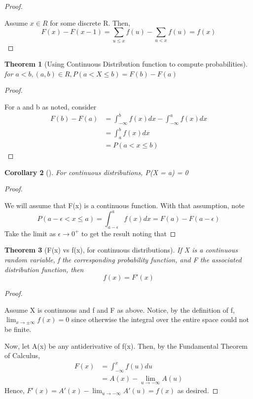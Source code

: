 \documentclass[10pt,]{book}
\theoremstyle{plain}
\newtheorem{theorem}{Theorem}[section]
\newtheorem{corollary}[theorem]{Corollary}
\theoremstyle{definition}
\theoremstyle{definition}
\theoremstyle{definition}
\numberwithin{equation}{section}
\newcommand{\lt}{ < }
\begin{document}
\begin{proof}\hypertarget{proof-25}{}
Assume \(x \in R\) for some discrete R. Then,
		\begin{equation*}F(x) - F(x-1) = \sum_{u \le x} f(u) - \sum_{u \lt x} f(u) = f(x)\end{equation*}
\end{proof}
\begin{theorem}[{Using Continuous Distribution function to compute probabilities}]\label{theorem-Fvsf-continuyous}
for \(a \lt b, (a,b) \in R, P(a \lt X \le b) = F(b) - F(a)\)\end{theorem}
\begin{proof}\hypertarget{proof-26}{}

		For a and b as noted, consider 
		\begin{align*}
F(b) - F(a) & = \int_{-\infty}^b f(x) dx - \int_{-\infty}^a f(x) dx\\
 & = \int_a^b f(x) dx \\
 & = P(a \lt x \le b)
\end{align*}
\end{proof}
\begin{corollary}[{}]\label{corollary-ProbPointZero-continuous}
For continuous distributions, P(X = a) = 0\end{corollary}
\begin{proof}\hypertarget{proof-27}{}

		We will assume that F(x) is a continuous function. With that assumption, note
		\begin{equation*}P(a-\epsilon \lt  x \le a)  = \int_{a-\epsilon}^a f(x) dx = F(a) - F(a-\epsilon)\end{equation*}
		Take the limit as \( \epsilon \rightarrow 0^+\) to get the result noting that
\end{proof}
\begin{theorem}[{F(x) vs f(x), for continuous distributions}]\label{theorem-26}
If X is a continuous random variable, f the corresponding probability function, and F the associated distribution function, then
			\begin{equation*}f(x) = F'(x)\end{equation*}
\end{theorem}
\begin{proof}\hypertarget{proof-28}{}
Assume X is continuous and f and F as above. Notice, by the definition of f, \(\lim_{x \rightarrow \pm \infty} f(x) = 0\) since otherwise the integral over the entire space could not be finite.
\par

	Now, let A(x) be any antiderivative of f(x). Then, by the Fundamental Theorem of Calculus,
	\begin{align*}
F(x) & = \int_{-\infty}^x f(u) du\\
 & = A(x) - \lim_{u \rightarrow -\infty} A(u)
\end{align*}
	Hence, \(F'(x) = A'(x) - \lim_{u \rightarrow -\infty} A'(u) = f(x)\) as desired.
\end{proof}
\typeout{************************************************}
\typeout{************************************************}
\end{document}
